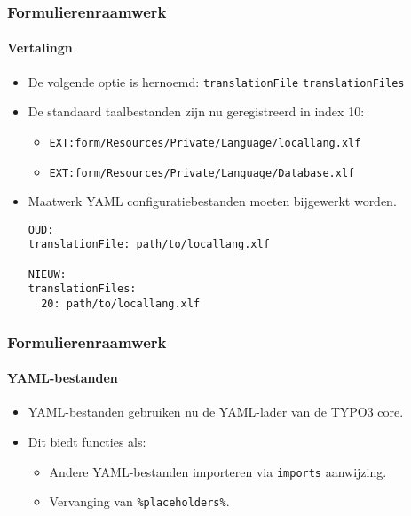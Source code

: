 \begin{frame}[fragile]
	\frametitle{Formulierenraamwerk}
	\framesubtitle{Vertalingn}

	\lstset{basicstyle=\tiny\ttfamily}

	\begin{itemize}
		\item De volgende optie is hernoemd:\newline
			\small\texttt{translationFile} \textrightarrow\hspace{0.1cm}\texttt{translationFiles}\normalsize
		\item De standaard taalbestanden zijn nu geregistreerd in index 10:

			\begin{itemize}
				\item \texttt{EXT:form/Resources/Private/Language/locallang.xlf}
				\item \texttt{EXT:form/Resources/Private/Language/Database.xlf}
			\end{itemize}

		\item Maatwerk YAML configuratiebestanden moeten bijgewerkt worden.
\begin{lstlisting}
OUD:
translationFile: path/to/locallang.xlf

NIEUW:
translationFiles:
  20: path/to/locallang.xlf
\end{lstlisting}

	\end{itemize}

\end{frame}


\begin{frame}[fragile]
	\frametitle{Formulierenraamwerk}
	\framesubtitle{YAML-bestanden}

	\begin{itemize}
		\item YAML-bestanden gebruiken nu de YAML-lader van de TYPO3 core.
		\item Dit biedt functies als:

			\begin{itemize}
				\item Andere YAML-bestanden importeren via \texttt{imports} aanwijzing.
				\item Vervanging van \texttt{\%placeholders\%}.
			\end{itemize}

	\end{itemize}

\end{frame}

